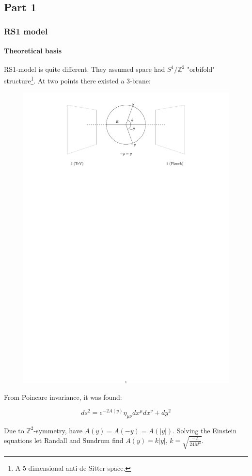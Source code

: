 \documentclass[10pt]{beamer}
\begin{document}
	\subsection{Part 1}
	\begin{frame}
		\frametitle{RS1 model}
		\framesubtitle{Theoretical basis}
		RS1-model is quite different. They assumed space had $S^1/\mathbb{Z}^2$ "orbifold" structure\footnote{A 5-dimensional anti-de Sitter space.}. At two points there existed a 3-brane:
		
		\begin{figure}[H]
			\centering
			\includegraphics[trim={12cm 22cm 11.5cm 0cm},scale=0.4]{RS1.pdf}
			\label{fig:gravitonChannel}
		\end{figure}
		
		From Poincare invariance, it was found:
		
		\begin{equation}
			ds^2 = e^{-2A(y)}\eta_{\mu\nu}dx^\mu dx^\nu + dy^2
		\end{equation}
		
		Due to $\mathbb{Z}^2$-symmetry, have $A(y) = A(-y) = A(|y|)$. Solving the Einstein equations let Randall and Sundrum find $A(y) = k|y|$, $k=\sqrt{\frac{-\Lambda}{24M^3}}$.
	\end{frame}
	
\end{document}
